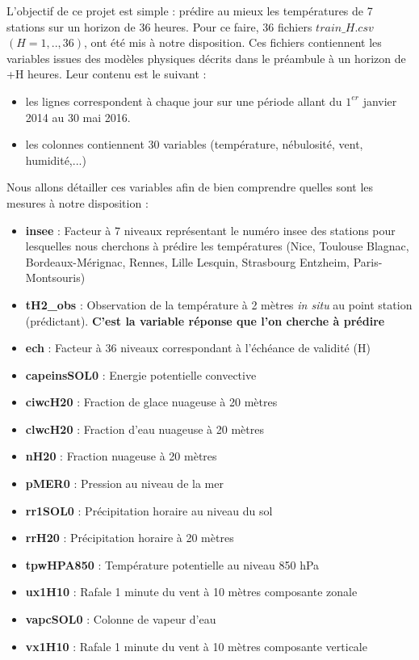 \documentclass[14pt, openany]{article}
\begin{document}
L'objectif de ce projet est simple : prédire au mieux les températures de 7 stations sur un horizon de 36 heures. Pour ce faire, 36 fichiers $train\_H.csv$ $(H=1,..,36)$, ont été mis à notre disposition. Ces fichiers contiennent les variables issues des modèles physiques décrits dans le préambule à un horizon de +H heures. Leur contenu est le suivant :
\begin{itemize}
\item les lignes correspondent à chaque jour sur une période allant du $1^{er}$ janvier 2014 au 30 mai 2016.
\item les colonnes contiennent 30 variables (température, nébulosité, vent, humidité,...)
\end{itemize}
Nous allons détailler ces variables afin de bien comprendre quelles sont les mesures à notre disposition :
\begin{itemize}
\item \textbf{insee} : Facteur à 7 niveaux représentant le numéro insee des stations pour lesquelles nous cherchons à prédire les températures (Nice, Toulouse Blagnac, Bordeaux-Mérignac, Rennes, Lille Lesquin, Strasbourg Entzheim, Paris-Montsouris)
\item \textbf{tH2\_obs} : Observation de la température à 2 mètres \textit{in situ} au point station (prédictant). \textbf{C'est la variable réponse que l'on cherche à prédire}
\item \textbf{ech} : Facteur à 36 niveaux correspondant à l'échéance de validité (H)
\item \textbf{capeinsSOL0} : Energie potentielle convective
\item \textbf{ciwcH20} : Fraction de glace nuageuse à 20 mètres
\item \textbf{clwcH20} : Fraction d'eau nuageuse à 20 mètres
\item \textbf{nH20} : Fraction nuageuse à 20 mètres
\item \textbf{pMER0} : Pression au niveau de la mer
\item \textbf{rr1SOL0} : Précipitation horaire au niveau du sol
\item \textbf{rrH20} : Précipitation horaire à 20 mètres
\item \textbf{tpwHPA850} : Température potentielle au niveau 850 hPa
\item \textbf{ux1H10} : Rafale 1 minute du vent à 10 mètres composante zonale
\item \textbf{vapcSOL0} : Colonne de vapeur d'eau
\item \textbf{vx1H10} : Rafale 1 minute du vent à 10 mètres composante verticale

\end{itemize}
\end{document}
